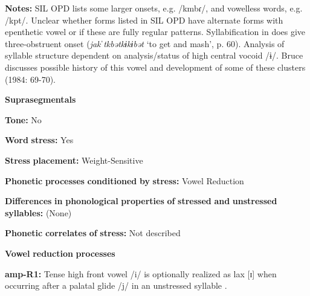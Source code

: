 \documentclass[output=paper]{langsci/langscibook}
\begin{document}
\begin{styleBody}
\textbf{Notes:} SIL OPD lists some larger onsets, e.g. /kmbɾ/, and vowelless words, e.g. /kpt/. Unclear whether forms listed in SIL OPD have alternate forms with epenthetic vowel or if these are fully regular patterns. Syllabification in \citet{Bruce1984} does give three-obstruent onset (\textit{jakˈtkbətkɨkɨbət} ‘to get and mash’, p. 60). Analysis of syllable structure dependent on analysis/status of high central vocoid /ɨ/. Bruce discusses possible history of this vowel and development of some of these clusters (1984: 69-70).
\end{styleBody}

\begin{styleBody}
\textbf{Suprasegmentals}
\end{styleBody}

\begin{styleBody}
\textbf{Tone:} No
\end{styleBody}

\begin{styleBody}
\textbf{Word} \textbf{stress:} Yes
\end{styleBody}

\begin{styleBody}
\textbf{Stress} \textbf{placement:} Weight-Sensitive
\end{styleBody}

\begin{styleBody}
\textbf{Phonetic} \textbf{processes} \textbf{conditioned} \textbf{by} \textbf{stress:} Vowel Reduction
\end{styleBody}

\begin{styleBody}
\textbf{Differences} \textbf{in} \textbf{phonological} \textbf{properties} \textbf{of} \textbf{stressed} \textbf{and} \textbf{unstressed} \textbf{syllables:} (None)
\end{styleBody}

\begin{styleBody}
\textbf{Phonetic} \textbf{correlates} \textbf{of} \textbf{stress:} Not described
\end{styleBody}

\begin{styleBody}
\textbf{Vowel} \textbf{reduction} \textbf{processes}
\end{styleBody}

\begin{styleBody}
\textbf{amp-R1:} Tense high front vowel /i/ is optionally realized as lax [ɪ] when occurring after a palatal glide /j/ in an unstressed syllable \citep[37]{Bruce1984}.
\end{styleBody}
\end{document}
